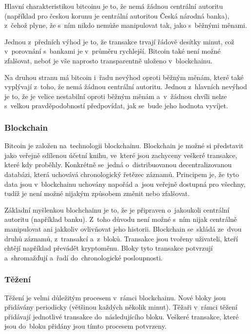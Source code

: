 \documentclass[thesis=B,czech]{FITthesis}[2019/03/21]
\begin{document}
Hlavní charakteristikou bitcoinu je to, že nemá žádnou centrální autoritu (například pro českou korunu je centrální autoritou Česká národná banka), z~čehož plyne, že s~ním nikdo nemůže manipulovat tak, jako s~běžnými měnami.

Jednou z~předních výhod je to, že transakce trvají řádově desítky minut, což v~porovnání s~bankami je v~průměru rychlejší. Bitcoin také není možné zfalšovat, neboť je vše naprosto transparentně uloženo v~blockchainu.

Na druhou stranu má bitcoin i~řadu nevýhod oproti běžným měnám, které také vyplývají z~toho, že nemá žádnou centrální autoritu. Jednou z~hlavních nevýhod je to, že je velice nestabilní oproti běžným měnám a~v~žádnou chvíli nelze s~velkou pravděpodobností předpovídat, jak se~bude jeho hodnota vyvíjet. \cite{Finex}

\subsubsection{Blockchain}
Bitcoin je založen na~technologii blockchainu. Blockchain je možné si představit jako veřejně sdílenou účetní knihu, ve~které jsou zachyceny veškeré transakce, které kdy proběhly. Konkrétně se~jedná o~distribuovanou decentralizovanou databázi, která uchovává chronologický řetězec záznamů. Principem je, že tyto data jsou v~blockchainu uchovány napořád a~jsou veřejně dostupná pro všechny, tudíž je není možné nijakým způsobem změnit nebo zfalšovat. \cite{Bitcoin_how_it_works}

Základní myšlenkou blochchainu je to, že je připraven o~jakoukoli centrální autoritu (například banku). Z~toho důvodu není možné s~ním nijak centrálně manipulovat ani jakkoliv ovlivňovat jeho historii.
Blockchain se~skládá ze~dvou druhů záznamů, z~transakcí a~z~bloků. Transakce jsou tvořeny uživateli, kteří chtějí například převádět kryptoměnu. Bloky tyto transakce potvrzují \linebreak a~shromažďují a~řadí do~chronologické posloupnosti. \cite{Finex_blockchain}

\subsubsection{Těžení}
Těžení je velmi důležitým procesem v~rámci blockchainu. Nové bloky jsou přidávány periodicky (většinou každých několik minut). Těžaři v~rámci těžení přidávají jednotlivé transakce do~následujícího bloku. Veškeré transakce, které jsou do~bloku přidány jsou tímto procesem potvrzeny. 
\end{document}
